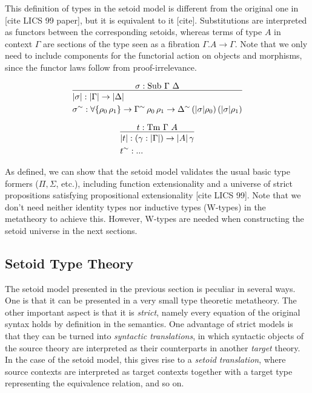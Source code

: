 \documentclass{easychair}
\newcommand{\GG}{\Gamma}
\newcommand{\GD}{\Delta}
\newcommand{\Tm}{\mathrm{Tm}}
\newcommand{\Sub}{\mathrm{Sub}}
\begin{document}
This definition of types in the setoid model is different from the original one
in [cite LICS 99 paper], but it is equivalent to it [cite].
%
Substitutions are interpreted as functors between the corresponding setoids,
whereas terms of type $A$ in context $\GG$ are sections of the type seen as a
fibration $\GG . A \to \GG$. Note that we only need to include components for
the functorial action on objects and morphisms, since the functor laws follow
from proof-irrelevance.

\[
\infer{
  \begin{aligned}
    & | \sigma | : | \GG | \to | \GD | \\
    & \sigma^\sim : \forall\{\rho_0\, \rho_1\} \to \GG^\sim\, \rho_0\, \rho_1 \to \GD^\sim\, (|\sigma|\rho_0)\, (|\sigma|\rho_1)
  \end{aligned}
}{
  \sigma : \Sub\ \GG\ \GD
}
\]

\[
\infer{
  \begin{aligned}
    & | t | : (\gamma : | \GG |) \to | A | \, \gamma \\
    & t^\sim : ...
  \end{aligned}
}{
  t : \Tm\ \GG\ A
}
\]

As defined, we can show that the setoid model validates the usual basic type
formers ($\Pi, \Sigma$, etc.), including function extensionality and a universe
of strict propositions satisfying propositional extensionality [cite LICS
  99]. Note that we don't need neither identity types nor inductive types
(W-types) in the metatheory to achieve this. However, W-types are needed when
constructing the setoid universe in the next sections.

\subsection{Setoid Type Theory}

The setoid model presented in the previous section is peculiar in several
ways. One is that it can be presented in a very small type theoretic
metatheory. The other important aspect is that it is \emph{strict}, namely every
equation of the original syntax holds by definition in the semantics. One
advantage of strict models is that they can be turned into \emph{syntactic
  translations}, in which syntactic objects of the source theory are interpreted
as their counterparts in another \emph{target} theory. In the case of the setoid
model, this gives rise to a \emph{setoid translation}, where source contexts are
interpreted as target contexts together with a target type representing the
equivalence relation, and so on.
\end{document}
